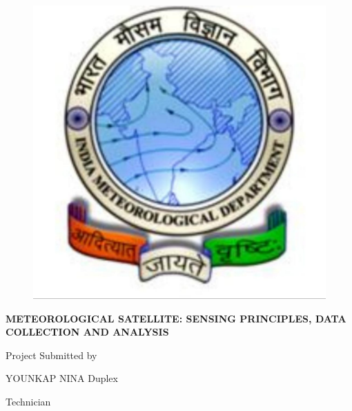 \documentclass[a4papert,12pt]{report}%
\begin{document}
\begin{center}
 \begin{figure}[htbp]
  \centering
  \includegraphics[scale=0.1]{imd.jpeg}
  \label{image1}
  \end{figure}
\end{center}
\begin{center}
	\Large {\textbf{ METEOROLOGICAL SATELLITE: SENSING PRINCIPLES, DATA COLLECTION AND ANALYSIS}} \vspace{ 0.5\baselineskip}
\end{center}
\begin{center}
	\Large {Project Submitted by}
\end{center}
	\vspace{ 0.0\baselineskip}
\begin{center}
	\Large {YOUNKAP NINA Duplex}
\end{center}

\vspace{ 0.0\baselineskip}
\begin{center}
\Large {  Technician}
\end{center}
\end{document}
